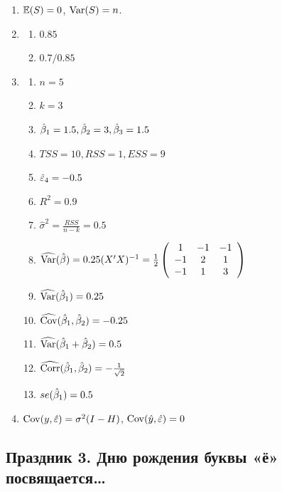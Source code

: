 \documentclass[12pt, a4paper]{article}
\begin{document}
\begin{enumerate}
\item $\mathbb{E}(S) = 0$, $\operatorname{Var}(S) = n$.
\item
\begin{enumerate}
\item $0.85$
\item $0.7 / 0.85$
\end{enumerate}
\item
\begin{enumerate}
\item $n = 5$
\item $k = 3$
\item $\hat{\beta}_1 = 1.5, \hat{\beta}_2 = 3, \hat{\beta}_3 = 1.5$
\item $TSS = 10, RSS = 1, ESS = 9$
\item $\hat{\varepsilon}_4 = -0.5$
\item $R^2 = 0.9$
\item $\hat{\sigma}^2 = \frac{RSS}{n-k} = 0.5$
\item $\widehat{\operatorname{Var}}(\hat{\beta}) = 0.25 (X'X)^{-1}=\frac{1}{2}\left(
\begin{array}{ccc}
1 & -1 & -1 \\
-1 & 2 & 1 \\
-1 & 1 & 3
\end{array}\right)$
\item $\widehat{\operatorname{Var}}(\hat{\beta}_1) = 0.25$
\item $\widehat{\operatorname{Cov}}(\hat{\beta}_1,\hat{\beta}_2) = -0.25$
\item $\widehat{\operatorname{Var}}(\hat{\beta}_1+\hat{\beta}_2) = 0.5$
\item $\widehat{\operatorname{Corr}}(\hat{\beta}_1,\hat{\beta}_2) = -\frac{1}{\sqrt{2}}$
\item $se(\hat{\beta}_1) = 0.5$
\end{enumerate}
\item $\operatorname{Cov}(y,\hat{\varepsilon}) = \sigma^2 (I-H)$, $\operatorname{Cov}(\hat{y},\hat{\varepsilon}) = 0$
\end{enumerate}


\subsection{Праздник 3. Дню рождения буквы «ё» посвящается\ldots}
\end{document}
